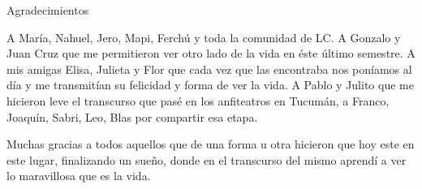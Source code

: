 \documentclass[12pt,papel,oneside]{ibtesis}
\begin{document}
\begin{postliminary}
\begin{seccion}{Agradecimientos}
\begin{small}
A María, Nahuel, Jero, Mapi, Ferchú y toda la comunidad de LC. A Gonzalo y Juan Cruz que me permitieron ver otro lado de la vida en éste último semestre. A mis amigas Elisa, Julieta y Flor que cada vez que las encontraba nos poníamos al día y me transmitían su felicidad y forma de ver la vida. A Pablo y Julito que me hicieron leve el transcurso que pasé en los anfiteatros en Tucumán,  a Franco, Joaquín, Sabri, Leo, Blas por compartir esa etapa.

Muchas gracias a todos aquellos que de una forma u otra hicieron que hoy este en este lugar, finalizando un sueño, donde en el transcurso del mismo aprendí a ver lo maravillosa que es la vida.

\end{small}


\end{seccion}



\end{postliminary}
\end{document}
